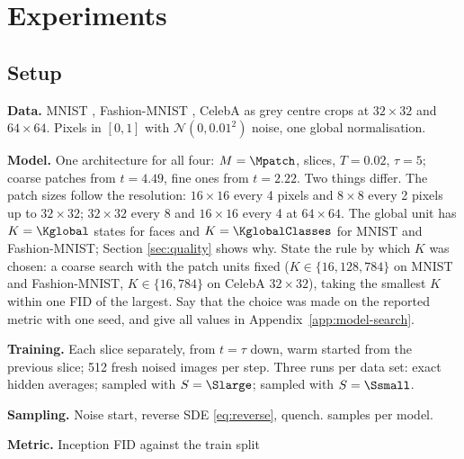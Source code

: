 \section{Experiments}
\label{sec:experiments}

\subsection{Setup}
\label{sec:setup}
\begin{plan}
  \item \textbf{Data.} MNIST \citep{lecun1998gradient}, Fashion-MNIST
        \citep{xiao2017fashion}, CelebA \citep{liu2015deep} as grey centre crops
        at $32\times32$ and $64\times64$. Pixels in $[0,1]$ with
        $\mathcal{N}(0,0.01^{2})$ noise, one global normalisation.
  \item \textbf{Model.} One architecture for all four: $M=\Mpatch$,
        \nSlices{} slices, $T=0.02$, $\tau=5$; coarse patches from $t=4.49$,
        fine ones from $t=2.22$. Two things differ. The patch sizes follow the
        resolution: $16\times16$ every 4 pixels and $8\times8$ every 2 pixels
        up to $32\times32$; $32\times32$ every 8 and $16\times16$ every 4 at
        $64\times64$. The global unit has $K=\Kglobal$ states for faces and
        $K=\KglobalClasses$ for MNIST and Fashion-MNIST; Section
        \ref{sec:quality} shows why.
        State the rule by which $K$ was chosen: a coarse search with the patch
        units fixed ($K\in\{16,128,784\}$ on MNIST and Fashion-MNIST,
        $K\in\{16,784\}$ on CelebA $32\times32$), taking the smallest $K$
        within one FID of the largest. Say that the choice was made on the
        reported metric with one seed, and give all values in
        Appendix~\ref{app:model-search}.
  \item \textbf{Training.} Each slice separately, from $t=\tau$ down, warm
        started from the previous slice; 512 fresh noised images per step.
        Three runs per data set: exact hidden averages; sampled with
        $S=\Slarge$; sampled with $S=\Ssmall$.
  \item \textbf{Sampling.} Noise start, reverse SDE \eqref{eq:reverse}, quench.
        \nSamples{} samples per model.
  \item \textbf{Metric.} Inception FID against the train split

\end{plan}
